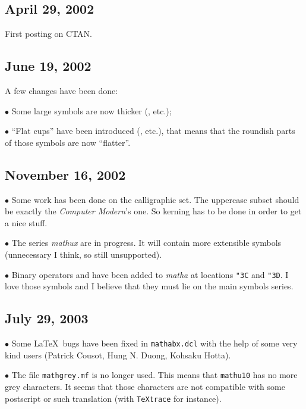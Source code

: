 \subsection*{April 29, 2002}
First posting on CTAN.

\subsection*{June 19, 2002}
A few changes have been done:

\item{$\bullet$}
Some large symbols are now thicker (\cs{\bigcup}, etc.);

\item{$\bullet$}
``Flat cups'' have been introduced (\cs{\bigcup}, etc.),
that means that the roundish parts of those symbols are
now ``flatter''.

\subsection*{November 16, 2002}

\item{$\bullet$}
Some work has been done on the calligraphic set. The uppercase
subset should be exactly the {\it Computer Modern}\/'s one. So
kerning has to be done in order to get a nice stuff.

\item{$\bullet$}
The series\/ {\it mathux}\/ are in progress. It will contain
more extensible symbols (unnecessary I think, so still unsupported).

\item{$\bullet$}
Binary operators {\tt\string\sprod} and {\tt\string\scoprod}
have been added to {\it matha}\/ at locations {\tt"3C} and {\tt "3D}.
I love those symbols and I believe that they must lie on the
main symbols series.

\subsection*{July 29, 2003}

\item{$\bullet$}
Some \LaTeX\ bugs have been fixed in {\tt mathabx.dcl}
with the help of some very kind users (Patrick Cousot, Hung N. Duong,
Kohsaku Hotta).

\item{$\bullet$}
The file {\tt mathgrey.mf} is no longer used. This means
that {\tt mathu10} has no more grey characters. It seems that
those characters are not compatible with some postscript
or such translation (with {\tt TeXtrace} for instance).

